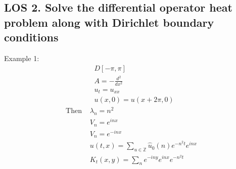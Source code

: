 \documentclass[12pt, a4paper]{article}
\begin{document}
\subsection*{LOS 2. Solve the differential operator heat problem along with Dirichlet boundary conditions}

Example 1:
\begin{align*}
    &D[-\pi, \pi]\\
    &A = -\frac{d^2}{dx^2}\\
    &u_t = u_{xx}\\
    &u(x, 0) = u(x+2\pi, 0)
\end{align*}
\begin{align*}
    \text{Then }&\lambda_n = n^2\\
    &V_n = e^{inx}\\
    &V_n = e^{-inx}\\
    &u(t, x) = \sum_{u\in\mathbb{Z}}\hat{u}_0(n)e^{-n^2t}e^{inx}\\
    &K_t(x, y) = \sum_ne^{-iny}e^{inx}e^{-n^2t}
\end{align*}
\vspace{0.3em}
\end{document}
